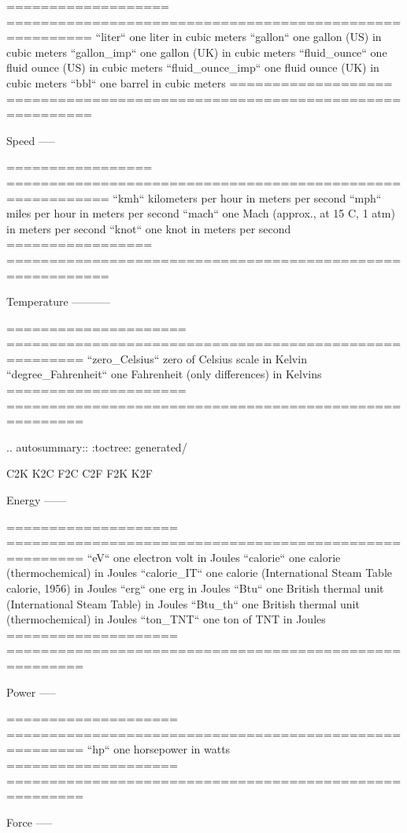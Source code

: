 \begin{DoxyVerb}
===================    ========================================================
``liter``              one liter in cubic meters
``gallon``             one gallon (US) in cubic meters
``gallon_imp``         one gallon (UK) in cubic meters
``fluid_ounce``        one fluid ounce (US) in cubic meters
``fluid_ounce_imp``    one fluid ounce (UK) in cubic meters
``bbl``                one barrel in cubic meters
===================    ========================================================

Speed
-----

=================    ==========================================================
``kmh``              kilometers per hour in meters per second
``mph``              miles per hour in meters per second
``mach``             one Mach (approx., at 15 C, 1 atm) in meters per second
``knot``             one knot in meters per second
=================    ==========================================================


Temperature
-----------

=====================  =======================================================
``zero_Celsius``       zero of Celsius scale in Kelvin
``degree_Fahrenheit``  one Fahrenheit (only differences) in Kelvins
=====================  =======================================================

.. autosummary::
   :toctree: generated/

   C2K
   K2C
   F2C
   C2F
   F2K
   K2F

Energy
------

====================  =======================================================
``eV``                one electron volt in Joules
``calorie``           one calorie (thermochemical) in Joules
``calorie_IT``        one calorie (International Steam Table calorie, 1956) in Joules
``erg``               one erg in Joules
``Btu``               one British thermal unit (International Steam Table) in Joules
``Btu_th``            one British thermal unit (thermochemical) in Joules
``ton_TNT``           one ton of TNT in Joules
====================  =======================================================

Power
-----

====================  =======================================================
``hp``                one horsepower in watts
====================  =======================================================

Force
-----


\end{DoxyVerb}

